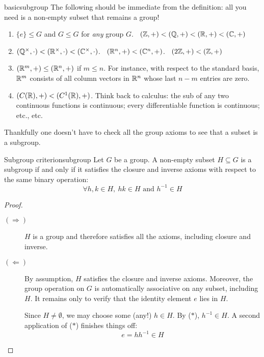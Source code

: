\begin{examples}{}{basicsubgroup}
	The following should be immediate from the definition: all you need is a non-empty subset that remains a group!
	\begin{enumerate}
	  \item\label{ex:basicsubgroup1} $\{e\}\le G$ and $G\le G$ for \emph{any} group $G$\qquad\qquad{}. \ $(\mathbb{Z},+)<(\mathbb{Q},+)<(\mathbb{R},+)<(\mathbb{C},+)$
	  \setcounter{enumi}{2}
		\item $(\mathbb{Q}^\times,\cdot)<(\mathbb{R}^\times,\cdot)<(\mathbb{C}^\times,\cdot)$\qquad{}. \ $(\mathbb{R}^n,+)<(\mathbb{C}^n,+)$\qquad{}. \ $(2\mathbb{Z},+)<(\mathbb{Z},+)$
		\item $(\mathbb{R}^m,+)\le (\mathbb{R}^n,+)$ if $m\le n$. For instance, with respect to the standard basis, $\mathbb{R}^m$ consists of all column vectors in $\mathbb{R}^n$ whose last $n-m$ entries are zero.
		\item$(C(\mathbb{R}),+)<(C^1(\mathbb{R}),+)$. Think back to calculus: the sub of any two continuous functions is continuous; every differentiable function is continuous; etc., etc.
	\end{enumerate}
\end{examples}

Thankfully one doesn't have to check all the group axioms to see that a subset is a subgroup.

\begin{thm}{Subgroup criterion}{subgroup}
	Let $G$ be a group. A non-empty subset $H\subseteq G$ is a subgroup if and only if it satisfies the closure and inverse axioms with respect to the same binary operation:
	\[
		\forall h,k\in H, \ hk\in H \text{ and }  h^{-1}\in H \tag{$\ast$}
	\]
\end{thm}

\begin{proof}
	\begin{description}
	\item[$(\Rightarrow)$] $H$ is a group and therefore satisfies all the axioms, including closure and inverse.
	\item[$(\Leftarrow)$] By assumption, $H$ satisfies the closure and inverse axioms. Moreover, the group operation on $G$ is automatically associative on any subset,\footnotemark{} including $H$. It remains only to verify that the identity element $e$ lies in $H$.\par
	Since $H\neq\emptyset$, we may choose some (any!) $h\in H$. By ($\ast$), $h^{-1}\in H$. A second application of ($\ast$) finishes things off:
	\[
		e=hh^{-1}\in H \tag*{\qedhere}
	\]
	\end{description}
\end{proof}

